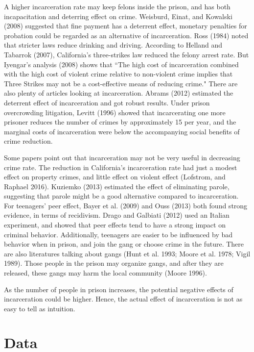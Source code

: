 \documentclass{article}
\begin{document}
A higher incarceration rate may keep felons inside the prison, and has both incapacitation and deterring effect on crime. Weisburd, Einat, and Kowalski (2008) suggested that fine payment has a deterrent effect, monetary penalties for probation could be regarded as an alternative of incarceration. Ross (1984) noted that stricter laws reduce drinking and driving. According to Helland and Tabarrok (2007), California's three-strikes law reduced the felony arrest rate. But Iyengar's analysis (2008) shows that ``The high cost of incarceration combined with the high cost of violent crime relative to non-violent crime implies that Three Strikes may not be a cost-effective means of reducing crime." There are also plenty of articles looking at incarceration. Abrams (2012) estimated the deterrent effect of incarceration and got robust results. Under prison overcrowding litigation, Levitt (1996) showed that incarcerating one more prisoner reduces the number of crimes by approximately 15 per year, and the marginal costs of incarceration were below the accompanying social benefits of crime reduction. 

Some papers point out that incarceration may not be very useful in decreasing crime rate. The reduction in California's incarceration rate had just a modest effect on property crimes, and little effect on violent effect (Lofstrom, and Raphael 2016). Kuziemko (2013) estimated the effect of eliminating parole, suggesting that parole might be a good alternative compared to incarceration. For teenagers' peer effect, Bayer et al. (2009) and Ouss (2013) both found strong evidence, in terms of recidivism. Drago and Galbiati (2012) used an Italian experiment, and showed that peer effects tend to have a strong impact on criminal behavior. Additionally, teenagers are easier to be influenced by bad behavior when in prison, and join the gang or choose crime in the future. There are also literatures talking about gangs (Hunt et al. 1993; Moore et al. 1978; Vigil 1989). Those people in the prison may organize gangs, and after they are released, these gangs may harm the local community (Moore 1996). 

As the number of people in prison increases, the potential negative effects of incarceration could be higher. Hence, the actual effect of incarceration is not as easy to tell as intuition. 


\section{Data}
\end{document}
